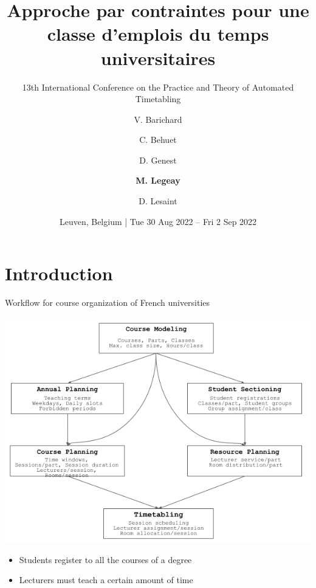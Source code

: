 \documentclass{beamer}
\author[M. Legeay]{V. Barichard \and
C. Behuet \and
D. Genest \and
\textbf{M. Legeay} \and
D. Lesaint}
\institute[UnivAngers - LERIA]{UnivAngers - LERIA (France)\\\url{https://ua-usp.github.io/timetabling/}}
\title[A Constraint Language for UTP]{Approche par contraintes pour une classe d'emplois du temps universitaires}
\subtitle{13th International Conference on the Practice and Theory of Automated Timetabling}
\date{Leuven, Belgium | Tue 30 Aug 2022 – Fri 2 Sep 2022}
\begin{document}
\begin{frame}
\titlepage
\end{frame}

\plan

\section{Introduction}

\begin{frame}{Workflow for course organization of French universities}
    \begin{center}
    \includegraphics[scale=.38]{img/utp_workflow.png}
    \end{center}
    
    \begin{itemize}
        \item Students register to all the courses of a degree
        \item Lecturers must teach a certain amount of time
    \end{itemize}
\end{frame}
\end{document}
